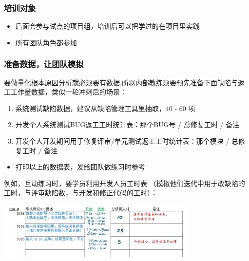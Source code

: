 \hypertarget{ux57f9ux8badux5bf9ux8c61}{%
\subsubsection{培训对象}\label{ux57f9ux8badux5bf9ux8c61}}

\begin{itemize}
\tightlist
\item
  后面会参与试点的项目组，培训后可以把学过的在项目里实践
\item
  所有团队角色都参加
\end{itemize}

\hypertarget{ux51c6ux5907ux6570ux636eux8ba9ux56e2ux961fux6a21ux62df}{%
\subsubsection{准备数据，让团队模拟}\label{ux51c6ux5907ux6570ux636eux8ba9ux56e2ux961fux6a21ux62df}}

要做量化根本原因分析就必须要有数据,所以内部教练须要预先准备下面缺陷与返工工作量数据，类似一轮冲刺后的场景：

\begin{enumerate}
\tightlist
\item
  系统测试缺陷数据，建议从缺陷管理工具里抽取，40 - 60 项
\item
  开发个人系统测试BUG返工工时统计表：那个BUG号 / 总修复工时 / 备注
\item
  开发个人开发期间用于修复评审/单元测试返工工时统计表：那个模块 /
  总修复工时 / 备注
\end{enumerate}

\begin{itemize}
\tightlist
\item
  打印以上的数据表，发给团队做练习时参考
\end{itemize}

例如，互动练习时，要学员利用开发人员工时表
（模拟他们迭代中用于改缺陷的工时，与评审缺陷数，与开发和修正代码的工时）：


\includegraphics[width=10cm]{缺陷表41.jpg}



